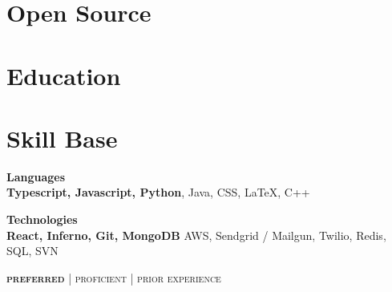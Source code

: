 \documentclass{article}
\begin{document}
\begin{minipage}[t]{0.38\textwidth}
  \vspace{0pt}

  \section{Open Source}

    

    

    

  \section{Education}

    

    

  \section{Skill Base}
  {\raggedright
    \textbf{Languages} \\
    {\small
      {\color{highlight}
        \textbf{Typescript, Javascript, Python}, Java, CSS,
      }
      LaTeX, C++
    }

    \vspace{5pt}

    \textbf{Technologies} \\
    {\small
      {\color{highlight}
        \textbf{React, Inferno, Git, MongoDB}
      }
      {\color{highlight}
        AWS, Sendgrid / Mailgun, Twilio,
      }
      Redis, SQL, SVN
    }

    \hfill\textsc{\footnotesize{{\color{highlight} \textbf{preferred}} | {\color{highlight} proficient} | prior experience}}
  }
\end{minipage}
\end{document}
